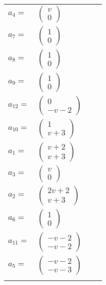 \documentclass[1p]{elsarticle_modified}
\theoremstyle{definition}
\begin{document}
\begin{tabular}{m{7pt} m{180pt} m{7pt} m{180pt} }
\flushright $a_{4}=$&$\begin{pmatrix}v\\0\end{pmatrix}$ \\
\flushright $a_{7}=$&$\begin{pmatrix}1\\0\end{pmatrix}$ \\
\flushright $a_{8}=$&$\begin{pmatrix}1\\0\end{pmatrix}$ \\
\flushright $a_{9}=$&$\begin{pmatrix}1\\0\end{pmatrix}$ \\
\flushright $a_{12}=$&$\begin{pmatrix}0\\- v-2\end{pmatrix}$ \\
\flushright $a_{10}=$&$\begin{pmatrix}1\\v+3\end{pmatrix}$ \\
\flushright $a_{1}=$&$\begin{pmatrix}v+2\\v+3\end{pmatrix}$ \\
\flushright $a_{3}=$&$\begin{pmatrix}v\\0\end{pmatrix}$ \\
\flushright $a_{2}=$&$\begin{pmatrix}2 v+2\\v+3\end{pmatrix}$ \\
\flushright $a_{6}=$&$\begin{pmatrix}1\\0\end{pmatrix}$ \\
\flushright $a_{11}=$&$\begin{pmatrix}- v-2\\- v-2\end{pmatrix}$ \\
\flushright $a_{5}=$&$\begin{pmatrix}- v-2\\- v-3\end{pmatrix}$\\&\end{tabular}
\end{document}
